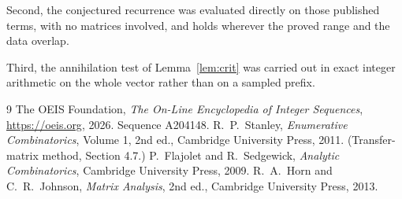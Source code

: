 \documentclass[11pt,a4paper]{article}
\theoremstyle{plain}
\theoremstyle{definition}
\begin{document}
Second, the conjectured recurrence was evaluated directly on those published terms, with no
matrices involved, and holds wherever the proved range and the data overlap.

Third, the annihilation test of Lemma~\ref{lem:crit} was carried out in exact integer
arithmetic on the whole vector rather than on a sampled prefix.

\begin{thebibliography}{9}
 The OEIS Foundation, \emph{The On-Line Encyclopedia of Integer
Sequences}, \url{https://oeis.org}, 2026. Sequence A204148.
 R.~P.~Stanley, \emph{Enumerative Combinatorics}, Volume 1, 2nd ed.,
Cambridge University Press, 2011. (Transfer-matrix method, Section 4.7.)
 P.~Flajolet and R.~Sedgewick, \emph{Analytic Combinatorics}, Cambridge
University Press, 2009.
 R.~A.~Horn and C.~R.~Johnson, \emph{Matrix Analysis}, 2nd ed., Cambridge
University Press, 2013.
\end{thebibliography}
\end{document}
